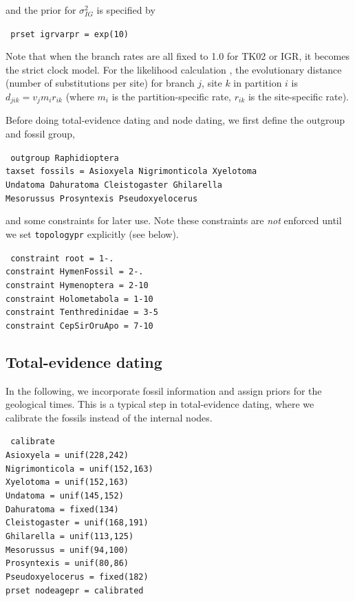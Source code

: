 \documentclass[12pt]{article}
\begin{document}
\noindent and the prior for $\sigma^2_{IG}$ is specified by 

\medskip
{\tt \color{red} \noindent
prset igrvarpr = exp(10)
}
\medskip

Note that when the branch rates are all fixed to 1.0 for TK02 or IGR, it becomes the strict clock model.
For the likelihood calculation \citep{Felsenstein:1981vk}, the evolutionary distance (number of substitutions per site) for branch $j$, site $k$ in partition $i$ is $d_{jik} = v_{j} m_i r_{ik}$ 
(where $m_i$ is the partition-specific rate, $r_{ik}$ is the site-specific rate).

Before doing total-evidence dating and node dating, we first define the outgroup and fossil group,

\medskip
{\tt \color{red} \noindent
outgroup Raphidioptera  \\
taxset fossils = Asioxyela Nigrimonticola Xyelotoma \\
\indent          Undatoma Dahuratoma Cleistogaster  Ghilarella\\
\indent          Mesorussus Prosyntexis Pseudoxyelocerus
}
\medskip

\noindent and some constraints for later use. Note these constraints are {\it not} enforced until we set {\tt topologypr} explicitly (see below).

\medskip
{\tt \color{red} \noindent
constraint root = 1-.           \\
constraint HymenFossil = 2-.    \\
constraint Hymenoptera = 2-10   \\
constraint Holometabola = 1-10  \\
constraint Tenthredinidae = 3-5 \\
constraint CepSirOruApo = 7-10
}
\medskip

\subsection{Total-evidence dating}

In the following, we incorporate fossil information and assign priors for the
geological times.
This is a typical step in total-evidence dating, where we calibrate the fossils instead of the internal nodes.

\medskip
{\tt \color{red} \noindent
calibrate  \\
\indent Asioxyela = unif(228,242)      \\
\indent Nigrimonticola = unif(152,163) \\
\indent Xyelotoma = unif(152,163)      \\
\indent Undatoma = unif(145,152)       \\
\indent Dahuratoma = fixed(134)        \\
\indent Cleistogaster = unif(168,191)  \\
\indent Ghilarella = unif(113,125)     \\
\indent Mesorussus = unif(94,100)      \\
\indent Prosyntexis = unif(80,86)      \\
\indent Pseudoxyelocerus = fixed(182)  \\
prset nodeagepr = calibrated
}
\medskip
\end{document}
